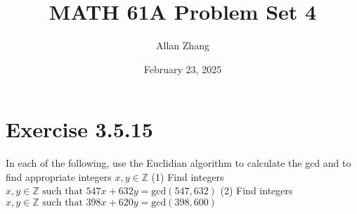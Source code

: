 \documentclass[hidelinks]{article}
\title{\textbf{MATH 61A Problem Set 4}}
\author{Allan Zhang}
\date{February 23, 2025}
\begin{document}
\hypersetup{bookmarksnumbered=true,}
\pagecolor{white}
\color{black}
\maketitle
\section*{Exercise 3.5.15}
In each of the following, use the Euclidian algorithm to calculate the gcd and to find appropriate integers $x, y \in \mathbb{Z}$
\newline
(1) Find integers $x, y \in \mathbb{Z} \text{ such that } 547x+632y = \text{gcd}(547, 632)$
\newline
(2) Find integers $x, y \in \mathbb{Z} \text{ such that } 398x+620y = \text{gcd}(398, 600)$
\end{document}
